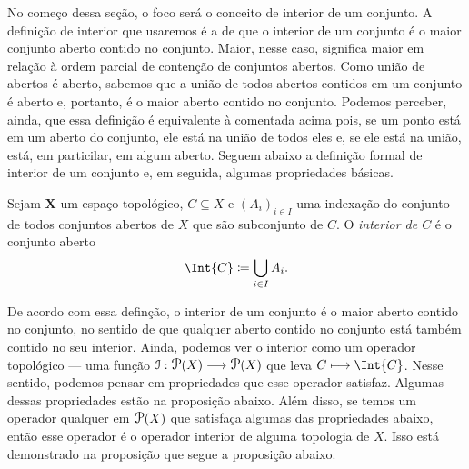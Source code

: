 	No começo dessa seção, o foco será o conceito de interior de um conjunto. A definição de interior que usaremos é a de que o interior de um conjunto é o maior conjunto aberto contido no conjunto. Maior, nesse caso, significa maior em relação à ordem parcial de contenção de conjuntos abertos. Como união de abertos é aberto, sabemos que a união de todos abertos contidos em um conjunto é aberto e, portanto, é o maior aberto contido no conjunto. Podemos perceber, ainda, que essa definição é equivalente à comentada acima pois, se um ponto está em um aberto do conjunto, ele está na união de todos eles e, se ele está na união, está, em particilar, em algum aberto. Seguem abaixo a definição formal de interior de um conjunto e, em seguida, algumas propriedades básicas.

\begin{defi}
	Sejam $\bm X$ um espaço topológico, $C \subseteq X$ e $(A_i)_{i \in I}$ uma indexação do conjunto de todos conjuntos abertos de $X$ que são subconjunto de $C$. O \emph{interior de $C$} é o conjunto aberto
	\begin{equation*}
	\Int{C} \coloneqq \bigcup_{i \in I} A_i.
	\end{equation*}
\end{defi}

	De acordo com essa definção, o interior de um conjunto é o maior aberto contido no conjunto, no sentido de que qualquer aberto contido no conjunto está também contido no seu interior. Ainda, podemos ver o interior como um operador topológico \---- uma função $\mathcal I: \p(X) \to \p(X)$ que leva $C \mapsto \Int{C}$. Nesse sentido, podemos pensar em propriedades que esse operador satisfaz. Algumas dessas propriedades estão na proposição abaixo. Além disso, se temos um operador qualquer em $\p(X)$ que satisfaça algumas das propriedades abaixo, então esse operador é o operador interior de alguma topologia de $X$. Isso está demonstrado na proposição que segue a proposição abaixo.

